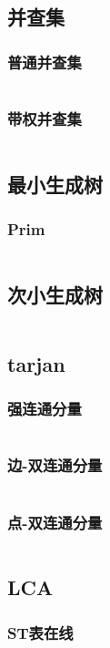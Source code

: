 \documentclass[a4paper,11pt]{article}
\begin{document}
\subsection{并查集}
\subsubsection{普通并查集}
\inputminted[]{c++}{Template/TreeGraph/UnionSetI.cpp}
\subsubsection{带权并查集}
\inputminted[]{c++}{Template/TreeGraph/UnionSetII.cpp}
\subsection{最小生成树}
\subsubsection{Prim}
\inputminted[]{c++}{Template/TreeGraph/MST-Prim.cpp}
\subsection{次小生成树}
\inputminted[]{c++}{Template/TreeGraph/SST.cpp}
\subsection{tarjan}
\subsubsection{强连通分量}
\inputminted[]{c++}{Template/TreeGraph/Tarjan-SCC.cpp}
\subsubsection{边-双连通分量}
\inputminted[]{c++}{Template/TreeGraph/Tarjan-Edge-BCC.cpp}
\subsubsection{点-双连通分量}
\inputminted[]{c++}{Template/TreeGraph/Tarjan-Vertex-BCC.cpp}
\subsection{LCA}
\subsubsection{ST表在线}
\inputminted[]{c++}{Template/TreeGraph/LCA-ST.cpp}
\end{document}

